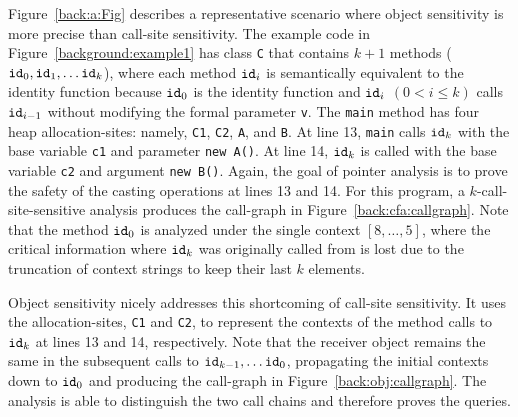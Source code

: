 Figure~\ref{back:a:Fig} %
describes a representative scenario where
object sensitivity is more precise than call-site sensitivity.
The example code in Figure~\ref{background:example1} has class {\tt C}
that contains $k+1$ methods
(${\tt id}_0, {\tt id}_1, \dots {\tt id}_k$), where each method
${\tt id}_i$ is semantically equivalent to the identity function
because ${\tt id}_0$ is the identity function and ${\tt id}_i$
{$(0< i \le k)$} calls ${\tt id}_{i-1}$ without modifying the formal
parameter {\tt v}.  The {\tt main} method has four heap allocation-sites:
namely, \texttt{C1}, \texttt{C2}, \texttt{A}, and \texttt{B}.  At line
13, {\tt main} calls ${\tt id}_k$ with the base variable {\tt c1} and
parameter \texttt{new A()}. At line {14}, ${\tt id}_k$ is called with
the base variable {\tt c2} and argument \texttt{new B()}.  Again, the goal
of pointer analysis is to prove the safety of the casting
operations at lines 13 and 14. For this program, a
$k$-call-site-sensitive analysis produces the call-graph in
Figure~\ref{back:cfa:callgraph}. Note that the method ${\tt id}_0$ is analyzed
under the single context ${[8,\dots,5]}$, where the critical information where
${\tt id}_k$ was originally called from is lost due to the truncation of
context strings to keep their last $k$ elements. 

Object sensitivity nicely addresses this shortcoming of call-site sensitivity. It uses the
allocation-sites, {\tt C1} and {\tt C2}, to represent the contexts of the
method calls to ${\tt id}_k$ at lines 13 and {14}, respectively. Note that the
receiver object remains the same in the subsequent calls to ${\tt id}_{k-1},
\dots {\tt id}_0$, propagating the initial contexts down to ${\tt id}_0$ and
producing the call-graph in Figure~\ref{back:obj:callgraph}. The
analysis is able to distinguish the two call chains and therefore proves the
queries.


